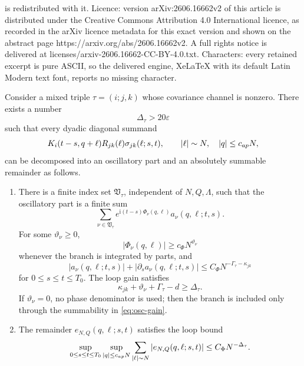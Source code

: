 \documentclass[10pt,a4paper]{amsart}
\newcommand{\eps}{\varepsilon}
\newcommand{\ii}{\mathrm i}
\begin{document}
is redistributed with it. Licence: version arXiv:2606.16662v2 of this article is distributed under the Creative Commons Attribution 4.0 International licence, as recorded in the arXiv licence metadata for this exact version and shown on the abstract page https://arxiv.org/abs/2606.16662v2. A full rights notice is delivered at licenses/arxiv-2606.16662-CC-BY-4.0.txt. Characters: every retained excerpt is pure ASCII, so the delivered engine, XeLaTeX with its default Latin Modern text font, reports no missing character.
\begin{assumption}\label{ass:diag}
Consider a mixed triple \(\tau=(i;j,k)\) whose covariance channel is nonzero.  There exists a number
\begin{equation}\label{eq:diag-gain}
        \Delta_{\tau}>20\eps
\end{equation}
such that every dyadic diagonal summand
\begin{equation}\label{eq:diag-summand}
        K_i(t-s,q+\ell)R_{jk}(\ell)\sigma_{jk}(\ell;s,t),
        \qquad |\ell|\sim N,\quad |q|\le c_{\rm ap}N,
\end{equation}
can be decomposed into an oscillatory part and an absolutely summable remainder as follows.

\begin{enumerate}[label=(D\arabic*),leftmargin=2.2em]
\item There is a finite index set \(\mathfrak V_\tau\), independent of \(N,Q,\Lambda\), such that the oscillatory part is a finite sum
\begin{equation}\label{eq:osc-decomp}
        \sum_{\nu\in\mathfrak V_\tau}
        e^{\ii(t-s)\Phi_\nu(q,\ell)}a_\nu(q,\ell;t,s).
\end{equation}
For some \(\vartheta_\nu\ge0\),
\begin{equation}\label{eq:phase-lower}
        |\Phi_\nu(q,\ell)|\ge c_\Phi N^{\vartheta_\nu}
\end{equation}
whenever the branch is integrated by parts, and
\begin{equation}\label{eq:amp-bound}
        |a_\nu(q,\ell;t,s)|+|\partial_sa_\nu(q,\ell;t,s)|
        \le C_\Phi N^{-\Gamma_\tau-\kappa_{jk}}
\end{equation}
for \(0\le s\le t\le T_0\).  The loop gain satisfies
\begin{equation}\label{eq:osc-gain}
        \kappa_{jk}+\vartheta_\nu+\Gamma_\tau-d\ge \Delta_\tau .
\end{equation}
If \(\vartheta_\nu=0\), no phase denominator is used; then the branch is included only through the summability in \eqref{eq:osc-gain}.

\item The remainder \(e_{N,Q}(q,\ell;s,t)\) satisfies the loop bound
\begin{equation}\label{eq:remainder-loop}
        \sup_{0\le s\le t\le T_0}\sup_{|q|\le c_{\rm ap}N}
        \sum_{|\ell|\sim N}|e_{N,Q}(q,\ell;s,t)|
        \le C_\Phi N^{-\Delta_\tau}.
\end{equation}
\end{enumerate}

\end{assumption}
\end{document}
